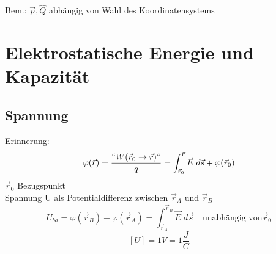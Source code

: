 \documentclass[titlepage,12pt,a4paper,ngerman]{report}
\begin{document}
Bem.: $\vec{p}, \hat{Q}$ abhängig von Wahl des Koordinatensystems

\section{Elektrostatische Energie und Kapazität}
\subsection{Spannung}
Erinnerung: $$\varphi(\vec{r}) = \frac{``W(\vec{r}_0 \rightarrow \vec{r})``}{q} = \int_{\vec{r}_0}^{\vec{r}} \vec{E} \; d\vec{s} + \varphi(\vec{r}_0)$$
$\vec{r}_0$ Bezugspunkt\\
Spannung U als Potentialdifferenz zwischen $\vec{r}_A$ und $\vec{r}_B$
$$U_{ba} = \varphi(\vec{r}_B) - \varphi(\vec{r}_A)  = \int_{\vec{r}_A}^{\vec{r}_B} \vec{E} \; d\vec{s} \quad \textrm{unabhängig von} \vec{r}_0$$
$$[U] = 1 V = 1 \frac{J}{C}$$
\end{document}
